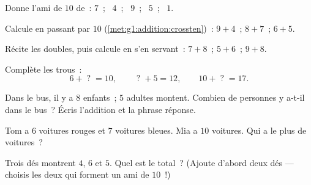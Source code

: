 \begin{exercise}[$\star$]\label{exo:g1:addition:3}
Donne l'ami de $10$ de~: $7$~; \ $4$~; \ $9$~; \ $5$~; \ $1$.
\end{exercise}

\begin{exercise}[$\star$]\label{exo:g1:addition:4}
Calcule en passant par $10$ (\cref{met:g1:addition:crossten})~:
$9 + 4$~; \quad $8 + 7$~; \quad $6 + 5$.
\end{exercise}

\begin{exercise}[$\star$]\label{exo:g1:addition:5}
Récite les doubles, puis calcule en s'en servant~: $7 + 8$~; \quad
$5 + 6$~; \quad $9 + 8$.
\end{exercise}

\begin{exercise}[$\star$]\label{exo:g1:addition:6}
Complète les trous~:
\[
6 + \;?\; = 10, \qquad
\;?\; + 5 = 12, \qquad
10 + \;?\; = 17 .
\]
\end{exercise}

\begin{exercise}[$\star$]\label{exo:g1:addition:7}
\guillemotleft{} Dans le bus, il y a $8$ enfants~; $5$ adultes
montent. Combien de personnes y a-t-il dans le bus~?
\guillemotright{} Écris l'addition et la phrase réponse.
\end{exercise}

\begin{exercise}[$\star$]\label{exo:g1:addition:8}
Tom a $6$ voitures rouges et $7$ voitures bleues. Mia a $10$
voitures. Qui a le plus de voitures~?
\end{exercise}

\begin{exercise}[$\star\star$]\label{exo:g1:addition:9}
Trois dés montrent $4$, $6$ et $5$. Quel est le total~? (Ajoute
d'abord deux dés --- choisis les deux qui forment un ami de $10$~!)
\end{exercise}
